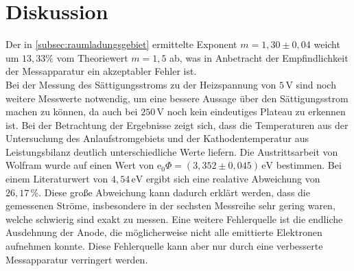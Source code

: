 \section{Diskussion}
\label{sec:Diskussion}

Der in \autoref{subsec:raumladungsgebiet} ermittelte Exponent $m = 1,30 \pm 0,04$ weicht um $13,33 \%$ vom Theoriewert
$m = 1,5$ ab, was in Anbetracht der Empfindlichkeit der Messapparatur ein akzeptabler Fehler ist. \\

Bei der Messung des Sättigungsstroms zu der Heizspannung von $5 \, \unit{\volt}$ sind noch weitere Messwerte notwendig, um eine bessere Aussage über den Sättigungsstrom machen zu können, da auch bei $250 \, \unit{\volt}$ noch kein eindeutiges Plateau zu erkennen ist.
Bei der Betrachtung der Ergebnisse zeigt sich, dass die Temperaturen aus der Untersuchung des Anlaufstromgebiets und der Kathodentemperatur aus Leistungsbilanz deutlich unterschiedliche Werte liefern.
Die Austrittsarbeit von Wolfram wurde auf einen Wert von $\text{e}_0 \Phi = (3,352 \pm 0,045) \,\unit{\eV}$ bestimmen. Bei einem Literaturwert von $4,54 \, \unit{\electronvolt}$ \cite{ap10} ergibt sich eine realative Abweichung von $ 26,17 \, \%$.
Diese große Abweichung kann dadurch erklärt werden, dass die gemessenen Ströme, insbesondere in der sechsten Messreihe sehr gering waren, welche schwierig sind exakt zu messen.
Eine weitere Fehlerquelle ist die endliche Ausdehnung der Anode, die möglicherweise nicht alle emittierte Elektronen aufnehmen konnte. Diese Fehlerquelle kann aber nur durch eine verbesserte Messapparatur verringert werden.
